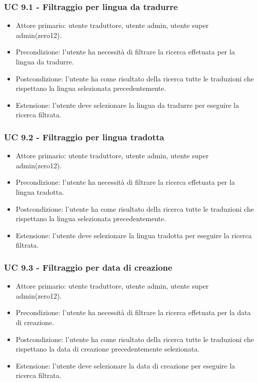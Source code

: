    \subsubsection{UC 9.1 - Filtraggio per lingua da tradurre}
        \begin{itemize}
            \item Attore primario: utente traduttore, utente admin, utente super admin(zero12).
            \item Precondizione: l'utente ha necessità di filtrare la ricerca effetuata per la lingua da tradurre.
            \item Postcondizione: l'utente ha come risultato della ricerca tutte le traduzioni che rispettano la lingua selezionata precedentemente. 
            \item Estensione: l'utente deve selezionare la lingua da tradurre per eseguire la ricerca filtrata.
        \end{itemize}        
    \subsubsection{UC 9.2 - Filtraggio per lingua tradotta}
        \begin{itemize}
            \item Attore primario: utente traduttore, utente admin, utente super admin(zero12).
            \item Precondizione: l'utente ha necessità di filtrare la ricerca effetuata per la lingua tradotta.
            \item Postcondizione: l'utente ha come risultato della ricerca tutte le traduzioni che rispettano la lingua selezionata precedentemente. 
            \item Estensione: l'utente deve selezionare la lingua tradotta per eseguire la ricerca filtrata.
        \end{itemize}        
    \subsubsection{UC 9.3 - Filtraggio per data di creazione}
        \begin{itemize}
            \item Attore primario: utente traduttore, utente admin, utente super admin(zero12).
            \item Precondizione: l'utente ha necessità di filtrare la ricerca effetuata per la data di creazione.
            \item Postcondizione: l'utente ha come risultato della ricerca tutte le traduzioni che rispettano la data di creazione precedentemente selezionata. 
            \item Estensione: l'utente deve selezionare la data di creazione per eseguire la ricerca filtrata.
        \end{itemize}       
